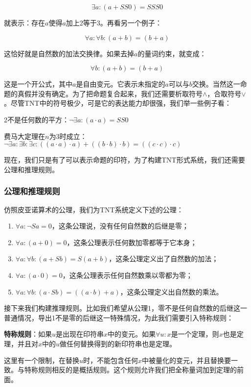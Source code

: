 \documentclass{article}
\begin{document}
\[
\exists a : (a + SS0) = SSS0
\]

就表示：存在$a$使得$a$加上2等于3。再看另一个例子：

\[
\forall a : \forall b : (a + b) = (b + a)
\]

这恰好就是自然数的加法交换律。如果去掉$a$的量词约束，就变成：

\[
\forall b : (a + b) = (b + a)
\]

这是一个开公式，其中$a$是自由变元。它表示未指定的$a$可以与$b$交换。当然这一命题的真假并没有确定。为了把命题复合起来，我们还需要析取符号$\land$，合取符号$\lor$。尽管TNT中的符号极少，可是它的表达能力却很强，我们举一些例子看：

2不是任何数的平方：$\lnot \exists a : (a \cdot a) = SS0$

费马大定理在$n$为3时成立：$\lnot \exists a : \exists b : \exists c : ((a \cdot a) \cdot a) + ((b \cdot b) \cdot b) = ((c \cdot c) \cdot c)$

现在，我们只是有了可以表示命题的印符，为了构建TNT形式系统，我们还需要公理和推理规则。

\subsubsection{公理和推理规则}

仿照皮亚诺算术的公理，我们为TNT系统定义下述的公理：

\begin{enumerate}
\item $\forall a : \lnot Sa = 0$，这条公理说，没有任何自然数的后继是零；
\item $\forall a: (a + 0) = 0$，这条公理表示任何数加零都等于它本身；
\item $\forall a: \forall b: (a + Sb) = S(a + b)$，这条公理定义出了自然数的加法；
\item $\forall a: (a \cdot 0) = 0$，这条公理表示任何自然数乘以零都为零；
\item $\forall a: \forall b: (a \cdot Sb) = ((a \cdot b) + a)$，这条公理定义出自然数的乘法。
\end{enumerate}

接下来我们构建推理规则。比如我们希望从公理1，零不是任何自然数的后继这一普通情况，导出1不是零的后继这一特殊情况，为此我们需要引入特称规则：

\textbf{特称规则}：如果$u$是出现在印符串$x$中的变元。如果$\forall u: x$是一个定理，则$x$也是定理，并且对$x$中的$u$做任何替换得到的新印符串也是定理。

这里有一个限制，在替换$u$时，不能包含任何$x$中被量化的变元，并且替换要一致。与特称规则相反的是概括规则。这个规则允许我们把全称量词加到定理的前面。
\end{document}
